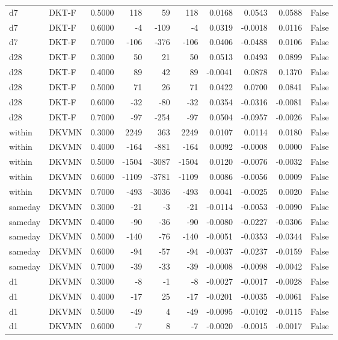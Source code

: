 \begin{tabular}{llrrrrrrrr}
d7 & DKT-F & 0.5000 & 118 & 59 & 118 & 0.0168 & 0.0543 & 0.0588 & False \\
d7 & DKT-F & 0.6000 & -4 & -109 & -4 & 0.0319 & -0.0018 & 0.0116 & False \\
d7 & DKT-F & 0.7000 & -106 & -376 & -106 & 0.0406 & -0.0488 & 0.0106 & False \\
d28 & DKT-F & 0.3000 & 50 & 21 & 50 & 0.0513 & 0.0493 & 0.0899 & False \\
d28 & DKT-F & 0.4000 & 89 & 42 & 89 & -0.0041 & 0.0878 & 0.1370 & False \\
d28 & DKT-F & 0.5000 & 71 & 26 & 71 & 0.0422 & 0.0700 & 0.0841 & False \\
d28 & DKT-F & 0.6000 & -32 & -80 & -32 & 0.0354 & -0.0316 & -0.0081 & False \\
d28 & DKT-F & 0.7000 & -97 & -254 & -97 & 0.0504 & -0.0957 & -0.0026 & False \\
within & DKVMN & 0.3000 & 2249 & 363 & 2249 & 0.0107 & 0.0114 & 0.0180 & False \\
within & DKVMN & 0.4000 & -164 & -881 & -164 & 0.0092 & -0.0008 & 0.0000 & False \\
within & DKVMN & 0.5000 & -1504 & -3087 & -1504 & 0.0120 & -0.0076 & -0.0032 & False \\
within & DKVMN & 0.6000 & -1109 & -3781 & -1109 & 0.0086 & -0.0056 & 0.0009 & False \\
within & DKVMN & 0.7000 & -493 & -3036 & -493 & 0.0041 & -0.0025 & 0.0020 & False \\
sameday & DKVMN & 0.3000 & -21 & -3 & -21 & -0.0114 & -0.0053 & -0.0090 & False \\
sameday & DKVMN & 0.4000 & -90 & -36 & -90 & -0.0080 & -0.0227 & -0.0306 & False \\
sameday & DKVMN & 0.5000 & -140 & -76 & -140 & -0.0051 & -0.0353 & -0.0344 & False \\
sameday & DKVMN & 0.6000 & -94 & -57 & -94 & -0.0037 & -0.0237 & -0.0159 & False \\
sameday & DKVMN & 0.7000 & -39 & -33 & -39 & -0.0008 & -0.0098 & -0.0042 & False \\
d1 & DKVMN & 0.3000 & -8 & -1 & -8 & -0.0027 & -0.0017 & -0.0028 & False \\
d1 & DKVMN & 0.4000 & -17 & 25 & -17 & -0.0201 & -0.0035 & -0.0061 & False \\
d1 & DKVMN & 0.5000 & -49 & 4 & -49 & -0.0095 & -0.0102 & -0.0115 & False \\
d1 & DKVMN & 0.6000 & -7 & 8 & -7 & -0.0020 & -0.0015 & -0.0017 & False \\

\end{tabular}
